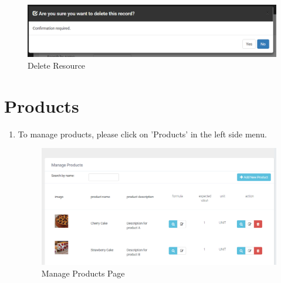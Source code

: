 \documentclass[a4paper,11pt,twoside]{report}
\theoremstyle{definition}
\begin{document}
\begin{figure}[h!]
\begin{center}
\includegraphics[width=\textwidth]{AS/resources/5}
\end{center}
\caption{Delete Resource}
\end{figure}
\thispagestyle{empty}

\section{Products}
\begin{enumerate}
\item To manage products, please click on 'Products' in the left side menu. 
\begin{figure}[h!]
\begin{center}
\includegraphics[width=\textwidth]{AS/product/1}
\end{center}
\caption{Manage Products Page}
\end{figure}
\thispagestyle{empty}


\end{enumerate}
\end{document}
